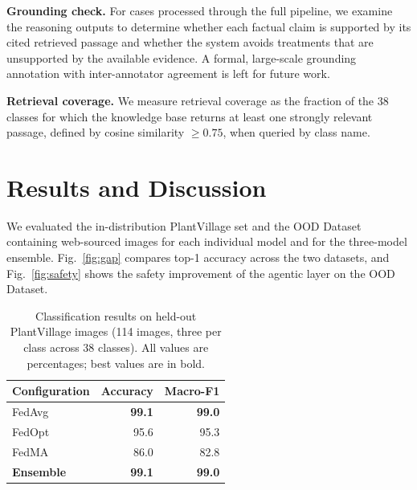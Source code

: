 \documentclass[conference]{IEEEtran}
\begin{document}
\textbf{Grounding check.} For cases processed through the full pipeline, we examine the reasoning outputs to determine whether each factual claim is supported by its cited retrieved passage and whether the system avoids treatments that are unsupported by the available evidence. A formal, large-scale grounding annotation with inter-annotator agreement is left for future work.

\textbf{Retrieval coverage.} We measure retrieval coverage as the fraction of the 38 classes for which the knowledge base returns at least one strongly relevant passage, defined by cosine similarity $\geq 0.75$, when queried by class name.
\section{Results and Discussion}
\label{sec:results}
We evaluated the in-distribution PlantVillage set and the OOD Dataset containing web-sourced images for each individual model and for the three-model ensemble. Fig.~\ref{fig:gap} compares top-1 accuracy across the two datasets, and Fig.~\ref{fig:safety} shows the safety improvement of the agentic layer on the OOD Dataset.

\begin{table}[H]
\centering
\caption{Classification results on held-out PlantVillage images (114 images, three per class across 38 classes). All values are percentages; best values are in bold.}
\label{tab:classification_id}
\small
\setlength{\tabcolsep}{8pt}
\begin{tabular}{lrr}
\toprule
\textbf{Configuration} & \textbf{Accuracy} & \textbf{Macro-F1} \\
\midrule
FedAvg & \textbf{99.1} & \textbf{99.0} \\
FedOpt & 95.6 & 95.3 \\
FedMA & 86.0 & 82.8 \\
\textbf{Ensemble} & \textbf{99.1} & \textbf{99.0} \\
\bottomrule
\end{tabular}
\end{table}
\end{document}
